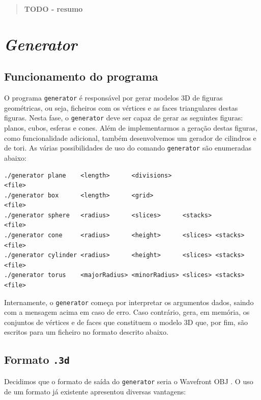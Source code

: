 \documentclass[12pt, a4paper]{article}
\begin{document}
\pagebreak

\begin{abstract}
    \textbf{\color{red} TODO - resumo}
\end{abstract}

\section{\emph{Generator}}

\subsection{Funcionamento do programa}

O programa \texttt{generator} é responsável por gerar modelos 3D de figuras geométricas, ou seja,
ficheiros com os vértices e as faces triangulares destas figuras. Nesta fase, o \texttt{generator}
deve ser capaz de gerar as seguintes figuras: planos, cubos, esferas e cones. Além de implementarmos
a geração destas figuras, como funcionalidade adicional, também desenvolvemos um gerador de
cilindros e de tori. As várias possibilidades de uso do comando \texttt{generator} são enumeradas
abaixo:

\begin{verbatim}
./generator plane    <length>      <divisions>                     <file>
./generator box      <length>      <grid>                          <file>
./generator sphere   <radius>      <slices>      <stacks>          <file>
./generator cone     <radius>      <height>      <slices> <stacks> <file>
./generator cylinder <radius>      <height>      <slices> <stacks> <file>
./generator torus    <majorRadius> <minorRadius> <slices> <stacks> <file>
\end{verbatim}

Internamente, o \texttt{generator} começa por interpretar os argumentos dados, saindo com a mensagem
acima em caso de erro. Caso contrário, gera, em memória, os conjuntos de vértices e de faces que
constituem o modelo 3D que, por fim, são escritos para um ficheiro no formato descrito abaixo.

\subsection{Formato \texttt{.3d}}

Decidimos que o formato de saída do \texttt{generator} seria o Wavefront OBJ \cite{wavefront-obj}.
O uso de um formato já existente apresentou diversas vantagens:
\end{document}
